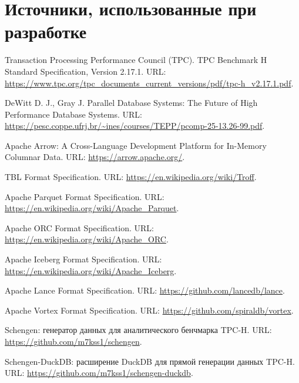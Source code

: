 \section{Источники, использованные при разработке}

\begingroup
\small
\sloppy
\begin{enumerate}[label={[\arabic*]}, leftmargin=1.2cm]
    \item \hypertarget{src:1}{}Transaction Processing Performance Council (TPC). TPC Benchmark H Standard Specification, Version 2.17.1. URL: \url{https://www.tpc.org/tpc_documents_current_versions/pdf/tpc-h_v2.17.1.pdf}.
    \item \hypertarget{src:2}{}DeWitt D. J., Gray J. Parallel Database Systems: The Future of High Performance Database Systems. URL: \url{https://pesc.coppe.ufrj.br/~ines/courses/TEPP/pcomp-25-13.26-99.pdf}.
    \item \hypertarget{src:3}{}Apache Arrow: A Cross-Language Development Platform for In-Memory Columnar Data. URL: \url{https://arrow.apache.org/}.
    \item \hypertarget{src:4}{}TBL Format Specification. URL: \url{https://en.wikipedia.org/wiki/Troff}.
    \item \hypertarget{src:5}{}Apache Parquet Format Specification. URL: \url{https://en.wikipedia.org/wiki/Apache_Parquet}.
    \item \hypertarget{src:6}{}Apache ORC Format Specification. URL: \url{https://en.wikipedia.org/wiki/Apache_ORC}.
    \item \hypertarget{src:7}{}Apache Iceberg Format Specification. URL: \url{https://en.wikipedia.org/wiki/Apache_Iceberg}.
    \item \hypertarget{src:8}{}Apache Lance Format Specification. URL: \url{https://github.com/lancedb/lance}.
    \item \hypertarget{src:9}{}Apache Vortex Format Specification. URL: \url{https://github.com/spiraldb/vortex}.
    \item \hypertarget{src:10}{}Schengen: генератор данных для аналитического бенчмарка TPC-H. URL: \url{https://github.com/m7kss1/schengen}.
    \item \hypertarget{src:11}{}Schengen-DuckDB: расширение DuckDB для прямой генерации данных TPC-H. URL: \url{https://github.com/m7kss1/schengen-duckdb}.
\end{enumerate}
\endgroup
